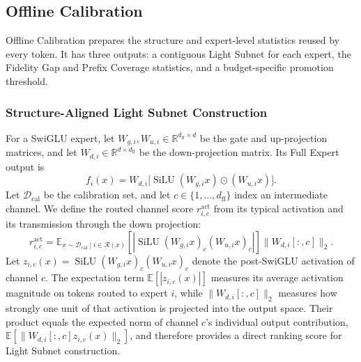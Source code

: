 \documentclass{article}
\newcommand{\Rset}{\mathcal{R}}
\begin{document}
\subsection{Offline Calibration}

Offline Calibration prepares the structure and expert-level statistics reused by every token. It has three outputs: a contiguous Light Subnet for each expert, the Fidelity Gap and Prefix Coverage statistics, and a budget-specific promotion threshold.

\subsubsection{Structure-Aligned Light Subnet Construction}

For a SwiGLU expert, let $W_{g,i},W_{u,i}\in\mathbb{R}^{d_{\mathrm{ff}}\times d}$ be the gate and up-projection matrices, and let $W_{d,i}\in\mathbb{R}^{d\times d_{\mathrm{ff}}}$ be the down-projection matrix. Its Full Expert output is
\begin{equation}
  f_i(x)=W_{d,i}\big[\operatorname{SiLU}(W_{g,i}x)\odot (W_{u,i}x)\big].
  \label{eq:swiglu}
\end{equation}
Let $\mathcal{D}_{\mathrm{cal}}$ be the calibration set, and let $c\in\{1,\ldots,d_{\mathrm{ff}}\}$ index an intermediate channel. We define the routed channel score $r^{\mathrm{act}}_{i,c}$ from its typical activation and its transmission through the down projection:
\begin{equation}
  r^{\mathrm{act}}_{i,c}=
  \mathbb{E}_{x\sim\mathcal{D}_{\mathrm{cal}}\mid i\in\Rset(x)}
  \left[\left|\operatorname{SiLU}(W_{g,i}x)_c(W_{u,i}x)_c\right|\right]
  \lVert W_{d,i}[:,c]\rVert_2.
  \label{eq:channel-score}
\end{equation}
Let $z_{i,c}(x)=\operatorname{SiLU}(W_{g,i}x)_c(W_{u,i}x)_c$ denote the post-SwiGLU activation of channel $c$. The expectation term $\mathbb{E}[|z_{i,c}(x)|]$ measures its average activation magnitude on tokens routed to expert $i$, while $\lVert W_{d,i}[:,c]\rVert_2$ measures how strongly one unit of that activation is projected into the output space. Their product equals the expected norm of channel $c$'s individual output contribution, $\mathbb{E}[\lVert W_{d,i}[:,c]z_{i,c}(x)\rVert_2]$, and therefore provides a direct ranking score for Light Subnet construction.
\end{document}
